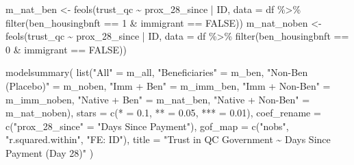 \documentclass[
  letterpaper,
  DIV=11,
  numbers=noendperiod]{scrartcl}
\newenvironment{Shaded}{\begin{snugshade}}{\end{snugshade}}
\newcommand{\AttributeTok}[1]{\textcolor[rgb]{0.40,0.45,0.13}{#1}}
\newcommand{\ConstantTok}[1]{\textcolor[rgb]{0.56,0.35,0.01}{#1}}
\newcommand{\DecValTok}[1]{\textcolor[rgb]{0.68,0.00,0.00}{#1}}
\newcommand{\FloatTok}[1]{\textcolor[rgb]{0.68,0.00,0.00}{#1}}
\newcommand{\FunctionTok}[1]{\textcolor[rgb]{0.28,0.35,0.67}{#1}}
\newcommand{\NormalTok}[1]{\textcolor[rgb]{0.00,0.23,0.31}{#1}}
\newcommand{\OtherTok}[1]{\textcolor[rgb]{0.00,0.23,0.31}{#1}}
\newcommand{\SpecialCharTok}[1]{\textcolor[rgb]{0.37,0.37,0.37}{#1}}
\newcommand{\StringTok}[1]{\textcolor[rgb]{0.13,0.47,0.30}{#1}}
\begin{document}
\begin{Shaded}
\begin{Highlighting}[]
\NormalTok{m\_nat\_ben }\OtherTok{\textless{}{-}} \FunctionTok{feols}\NormalTok{(trust\_qc }\SpecialCharTok{\textasciitilde{}}\NormalTok{ prox\_28\_since }\SpecialCharTok{|}\NormalTok{ ID,}
                   \AttributeTok{data =}\NormalTok{ df }\SpecialCharTok{\%\textgreater{}\%} \FunctionTok{filter}\NormalTok{(ben\_housingbnft }\SpecialCharTok{==} \DecValTok{1} \SpecialCharTok{\&}\NormalTok{ immigrant }\SpecialCharTok{==} \ConstantTok{FALSE}\NormalTok{))}
\NormalTok{m\_nat\_noben }\OtherTok{\textless{}{-}} \FunctionTok{feols}\NormalTok{(trust\_qc }\SpecialCharTok{\textasciitilde{}}\NormalTok{ prox\_28\_since }\SpecialCharTok{|}\NormalTok{ ID,}
                     \AttributeTok{data =}\NormalTok{ df }\SpecialCharTok{\%\textgreater{}\%} \FunctionTok{filter}\NormalTok{(ben\_housingbnft }\SpecialCharTok{==} \DecValTok{0} \SpecialCharTok{\&}\NormalTok{ immigrant }\SpecialCharTok{==} \ConstantTok{FALSE}\NormalTok{))}

\FunctionTok{modelsummary}\NormalTok{(}
  \FunctionTok{list}\NormalTok{(}\StringTok{"All"} \OtherTok{=}\NormalTok{ m\_all,}
       \StringTok{"Beneficiaries"} \OtherTok{=}\NormalTok{ m\_ben,}
       \StringTok{"Non{-}Ben (Placebo)"} \OtherTok{=}\NormalTok{ m\_noben,}
       \StringTok{"Imm + Ben"} \OtherTok{=}\NormalTok{ m\_imm\_ben,}
       \StringTok{"Imm + Non{-}Ben"} \OtherTok{=}\NormalTok{ m\_imm\_noben,}
       \StringTok{"Native + Ben"} \OtherTok{=}\NormalTok{ m\_nat\_ben,}
       \StringTok{"Native + Non{-}Ben"} \OtherTok{=}\NormalTok{ m\_nat\_noben),}
  \AttributeTok{stars =} \FunctionTok{c}\NormalTok{(}\StringTok{\textquotesingle{}*\textquotesingle{}} \OtherTok{=} \FloatTok{0.1}\NormalTok{, }\StringTok{\textquotesingle{}**\textquotesingle{}} \OtherTok{=} \FloatTok{0.05}\NormalTok{, }\StringTok{\textquotesingle{}***\textquotesingle{}} \OtherTok{=} \FloatTok{0.01}\NormalTok{),}
  \AttributeTok{coef\_rename =} \FunctionTok{c}\NormalTok{(}\StringTok{"prox\_28\_since"} \OtherTok{=} \StringTok{"Days Since Payment"}\NormalTok{),}
  \AttributeTok{gof\_map =} \FunctionTok{c}\NormalTok{(}\StringTok{"nobs"}\NormalTok{, }\StringTok{"r.squared.within"}\NormalTok{, }\StringTok{"FE: ID"}\NormalTok{),}
  \AttributeTok{title =} \StringTok{"Trust in QC Government \textasciitilde{} Days Since Payment (Day 28)"}
\NormalTok{)}
\end{Highlighting}
\end{Shaded}
\end{document}
